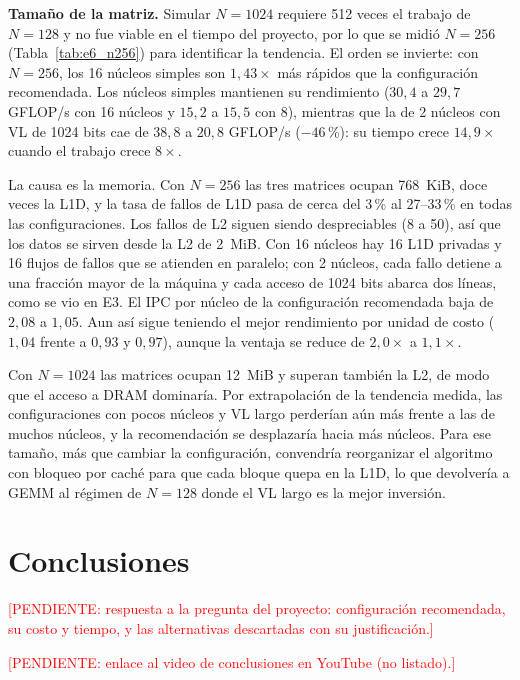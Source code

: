 \documentclass[journal]{IEEEtran}
\newcommand{\pendiente}[1]{\textcolor{red}{[PENDIENTE: #1]}}
\begin{document}
\textbf{Tamaño de la matriz.} Simular $N=1024$ requiere 512 veces el
trabajo de $N=128$ y no fue viable en el tiempo del proyecto, por lo que
se midió $N=256$ (Tabla~\ref{tab:e6_n256}) para identificar la
tendencia. El orden se invierte: con $N=256$, los 16 núcleos simples
son $1{,}43\times$ más rápidos que la configuración recomendada. Los
núcleos simples mantienen su rendimiento ($30{,}4$ a $29{,}7$ GFLOP/s
con 16 núcleos y $15{,}2$ a $15{,}5$ con 8), mientras que la de 2 núcleos
con VL de 1024 bits cae de $38{,}8$ a $20{,}8$ GFLOP/s ($-46$\,\%): su
tiempo crece $14{,}9\times$ cuando el trabajo crece $8\times$.

La causa es la memoria. Con $N=256$ las tres matrices ocupan
\SI{768}{KiB}, doce veces la L1D, y la tasa de fallos de L1D pasa de
cerca del 3\,\% al 27--33\,\% en todas las configuraciones. Los fallos de
L2 siguen siendo despreciables (8 a 50), así que los datos se sirven
desde la L2 de \SI{2}{MiB}. Con 16 núcleos hay 16 L1D privadas y 16
flujos de fallos que se atienden en paralelo; con 2 núcleos, cada fallo
detiene a una fracción mayor de la máquina y cada acceso de 1024 bits
abarca dos líneas, como se vio en E3. El IPC por núcleo de la
configuración recomendada baja de $2{,}08$ a $1{,}05$. Aun así sigue
teniendo el mejor rendimiento por unidad de costo ($1{,}04$ frente a
$0{,}93$ y $0{,}97$), aunque la ventaja se reduce de $2{,}0\times$ a
$1{,}1\times$.

Con $N=1024$ las matrices ocupan \SI{12}{MiB} y superan también la
L2, de modo que el acceso a DRAM dominaría. Por extrapolación de la
tendencia medida, las configuraciones con pocos núcleos y VL largo
perderían aún más frente a las de muchos núcleos, y la recomendación se
desplazaría hacia más núcleos. Para ese tamaño, más que cambiar la
configuración, convendría reorganizar el algoritmo con bloqueo por
caché \cite{goto2008} para que cada bloque quepa en la L1D, lo que
devolvería a GEMM al régimen de $N=128$ donde el VL largo es la mejor
inversión.

\section{Conclusiones}
\label{sec:conclusiones}

\pendiente{respuesta a la pregunta del proyecto: configuración
recomendada, su costo y tiempo, y las alternativas descartadas con su
justificación.}

\pendiente{enlace al video de conclusiones en YouTube (no listado).}

\printbibliography
\end{document}
